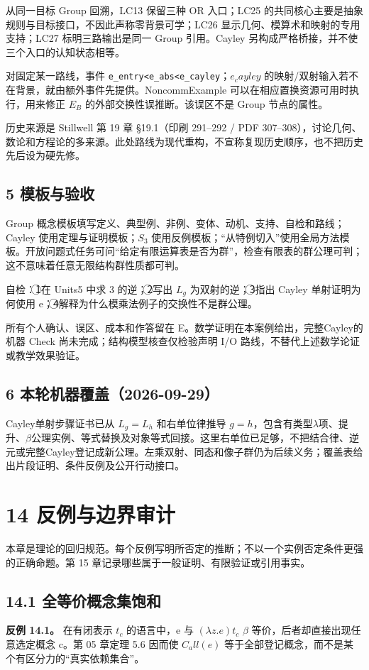\documentclass[UTF8,a4paper,zihao=-4,fontset=windows,openany]{ctexbook}
\newcommand{\mcsnum}[1]{\textcircled{\scriptsize #1}}
\newcommand{\mcsorigin}[1]{\par\noindent{\small\color{black!55}#1}\par\addvspace{0.8em}}
\def\mathrm#1{#1}%
\newcommand{\mcsbrk}{\penalty 200\relax}
\begin{document}
从同一目标 Group 回溯，LC13 保留三种 OR 入口；LC25 的共同核心主要是抽象规则与目标接口，不因此声称零背景可学；LC26 显示几何、模算术和映射的专用支持；LC27 标明三路输出是同一 Group 引用。Cayley 另构成严格桥接，并不使三个入口的认知状态相等。

对固定某一路线，事件 \texttt{e\mcsbrk\_entry<e\mcsbrk\_abs<e\mcsbrk\_cayley}；\(e_\mathrm{cayley}\) 的映射/双射输入若不在背景，就由额外事件先提供。NoncommExample 可以在相应置换资源可用时执行，用来修正 \(E_B\) 的外部交换性误推断。该误区不是 Group 节点的属性。

历史来源是 Stillwell 第 19 章 §19.1（印刷 291–292 / PDF 307–308），讨论几何、数论和方程论的多来源。此处路线为现代重构，不宣称复现历史顺序，也不把历史先后设为硬先修。

\section{5 模板与验收}
Group 概念模板填写定义、典型例、非例、变体、动机、支持、自检和路线；Cayley 使用定理与证明模板；\(S_{3}\) 使用反例模板；“从特例切入”使用全局方法模板。开放问题式任务可问“给定有限运算表是否为群”，检查有限表的群公理可判；这不意味着任意无限结构群性质都可判。

自检：\mcsnum{1}在 Units5 中求 3 的逆；\mcsnum{2}写出 \(L_g\) 为双射的逆；\mcsnum{3}指出 Cayley 单射证明为何使用 e；\mcsnum{4}解释为什么模乘法例子的交换性不是群公理。

所有个人确认、误区、成本和作答留在 E。数学证明在本案例给出，完整Cayley的机器 Check 尚未完成；结构模型核查仅检验声明 I/O 路线，不替代上述数学论证或教学效果验证。

\section{6 本轮机器覆盖（2026-09-29）}
Cayley单射步骤证书已从 \(L_g=L_h\) 和右单位律推导 \(g=h\)，包含有类型\(\lambda\)项、提升、\(\beta\)公理实例、等式替换及对象等式回接。这里右单位已足够，不把结合律、逆元或完整Cayley登记成新公理。左乘双射、同态和像子群仍为后续义务；覆盖表给出片段证明、条件反例及公开行动接口。

\clearpage\chapter{14 反例与边界审计}
\mcsorigin{原章节：14-反例集.md}
本章是理论的回归规范。每个反例写明所否定的推断；不以一个实例否定条件更强的正确命题。第 15 章记录哪些属于一般证明、有限验证或引用事实。

\section{14.1 全等价概念集饱和}
\textbf{反例 14.1。} 在有闭表示 \(t_c\) 的语言中，e 与 \((\lambda z.e)t_c\) \(\beta\) 等价，后者却直接出现任意选定概念 c。第 05 章定理 5.6 因而使 \(C_\mathrm{all}(e)\) 等于全部登记概念，而不是某个有区分力的“真实依赖集合”。
\end{document}
